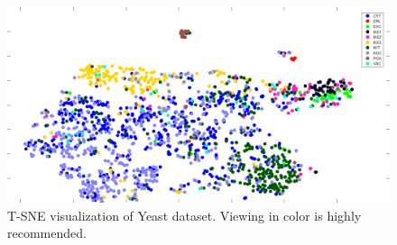 \begin{figure}
	\centering
	\includegraphics[width=0.9\linewidth]{figures/png/YeastTSNE}
	\caption[T-SNE visualization of Yeast dataset]{T-SNE visualization of Yeast dataset. Viewing in color is highly recommended.}
		\label{fig:yeasttsne}
\end{figure}




